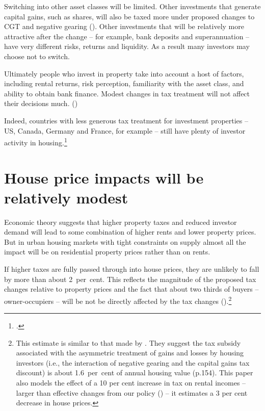 Switching into other asset classes will be limited. Other investments that generate capital gains, such as shares, will also be taxed more under proposed changes to CGT and negative gearing (). Other investments that will be relatively more attractive after the change – for example, bank deposits and superannuation – have very different risks, returns and liquidity. As a result many investors may choose not to switch. 

Ultimately people who invest in property take into account a host of factors, including rental returns, risk perception, familiarity with the asset class, and ability to obtain bank finance. Modest changes in tax treatment will not affect their decisions much. ()

Indeed, countries with less generous tax treatment for investment properties – US, Canada, Germany and France, for example – still have plenty of investor activity in housing.\footcite{ABS2010MeasuresOfAustraliasProgress}



\section{House price impacts will be relatively modest}
Economic theory suggests that higher property taxes and reduced investor demand will lead to some combination of higher rents and lower property prices. But in urban housing markets with tight constraints on supply almost all the impact will be on residential property prices rather than on rents.

If higher taxes are fully passed through into house prices, they are unlikely to fall by more than about 2~per~cent. This reflects the magnitude of the proposed tax changes relative to property prices and the fact that about two thirds of buyers – owner-occupiers – will be not be directly affected by the tax changes ().\footnote{This estimate is similar to that made by \textcite[][154]{AbelsonJoyeux2007}. They suggest the tax subsidy associated with the asymmetric treatment of gains and losses by housing investors (i.e., the interaction of negative gearing and the capital gains tax discount) is about 1.6~per~cent of annual housing value (p.154). This paper also models the effect of a 10 per cent increase in tax on rental incomes – larger than effective changes from our policy () – it estimates a 3 per cent decrease in house prices.}

